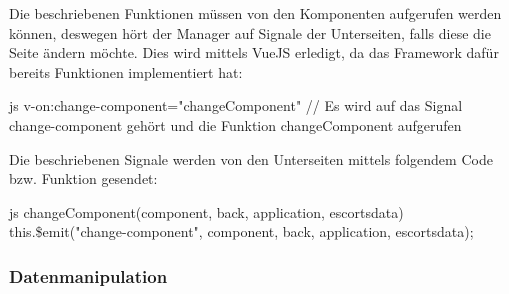 Die beschriebenen Funktionen müssen von den Komponenten aufgerufen werden können, deswegen hört der Manager auf Signale der Unterseiten, falls diese die Seite ändern möchte. Dies wird mittels VueJS erledigt, da das Framework dafür bereits Funktionen implementiert hat:
\begin{code}{js}
	v-on:change-component="changeComponent"
	// Es wird auf das Signal change-component gehört und die Funktion changeComponent aufgerufen
\end{code}

Die beschriebenen Signale werden von den Unterseiten mittels folgendem Code bzw. Funktion gesendet:
\begin{code}{js}
	changeComponent(component, back, application, escortsdata) {
		this.\$emit("change-component", component, back, application, escortsdata);
	}
\end{code}
\subsubsection{Datenmanipulation}
